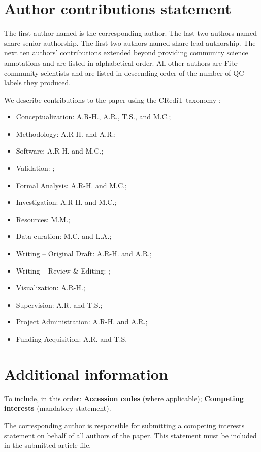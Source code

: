 \documentclass[fleqn,10pt]{wlscirep}
\begin{document}
\section*{Author contributions statement}

The first author named is the corresponding author. The last two authors named
share senior authorship. The first two authors named share lead authorship.  The
next ten authors' contributions extended beyond providing community science
annotations and are listed in alphabetical order. All other authors are Fibr
community scientists and are listed in descending order of the number of QC
labels they produced.


We describe contributions to the paper using the CRediT taxonomy \cite{brand2015-vd}:
\begin{itemize}
    \item Conceptualization: A.R-H., A.R., T.S., and M.C.;
    \item Methodology: A.R-H. and A.R.;
    \item Software: A.R-H. and M.C.;
    \item Validation: ;
    \item Formal Analysis: A.R-H. and M.C.;
    \item Investigation: A.R-H. and M.C.;
    \item Resources: M.M.;
    \item Data curation: M.C. and L.A.;
    \item Writing – Original Draft: A.R-H. and A.R.;
    \item Writing – Review \& Editing: ;
    \item Visualization: A.R-H.;
    \item Supervision: A.R. and T.S.;
    \item Project Administration: A.R-H. and A.R.;
    \item Funding Acquisition: A.R. and T.S.
\end{itemize}

\section*{Additional information}

To include, in this order: \textbf{Accession codes} (where applicable);
\textbf{Competing interests} (mandatory statement).

The corresponding author is responsible for submitting a
\href{http://www.nature.com/srep/policies/index.html#competing}{competing
interests statement} on behalf of all authors of the paper. This statement must
be included in the submitted article file.
\end{document}
